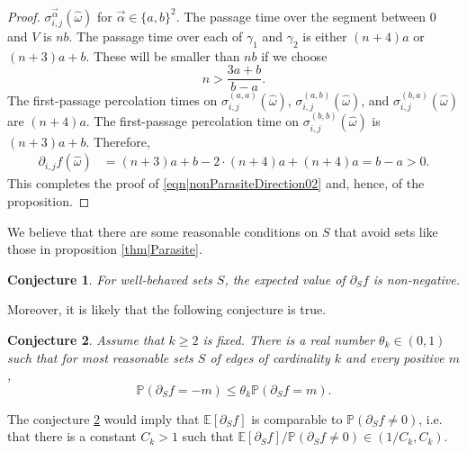 \documentclass[reqno]{amsart}
\newtheorem{conjecture}{Conjecture}
\begin{document}
\begin{proof}
$\sigma_{i,j}^{\overrightarrow \alpha}(\hat\omega)$ for $\overrightarrow \alpha\in\{a,b\}^2$. 
 The passage time over the segment between $0$ and $V$ is 
$nb$. The passage time over each of $\gamma_1$ and $\gamma_2$ is either $(n+4)a$ or $(n+3)a+b$. These will be smaller than 
$nb$ if we choose \[n>\frac{3a+b}{b-a}.\]
The first-passage percolation times on $\sigma_{i,j}^{(a,a)}(\hat\omega)$, $\sigma_{i,j}^{(a,b)}(\hat\omega)$, and 
$\sigma_{i,j}^{(b,a)}(\hat\omega)$ are $(n+4)a$. The first-passage percolation time on $\sigma_{i,j}^{(b,b)}(\hat\omega)$
is $(n+3)a+b$. Therefore, 
\begin{align*}
\partial_{i,j}f(\hat\omega)&=(n+3)a+b-2\cdot (n+4)a+(n+4)a=b-a>0.
\end{align*}
This completes the proof of \eqref{eqn|nonParasiteDirection02} and, hence, of the proposition.
\end{proof}


We believe that there are some reasonable conditions on $S$ that avoid sets like those in proposition \ref{thm|Parasite}. 
\begin{conjecture}\label{conj|PositiveExpectation} For well-behaved sets $S$, the expected value of $\partial_Sf$ is non-negative. 
\end{conjecture}




Moreover, it is likely that the following conjecture is true.
 \begin{conjecture}\label{conj|PositiveDrift} Assume that $k\geq 2$ is fixed. There is a real number $\theta_k\in(0,1)$ such that for most reasonable sets $S$ of edges  of cardinality $k$ and every positive $m$, \[\mathbb P(\partial_Sf=-m)\leq  \theta_k \mathbb P(\partial_Sf=m).\] 
\end{conjecture}
The conjecture \ref{conj|PositiveDrift} would imply that $\mathbb E\left[\partial_Sf\right]$ is comparable to $\mathbb P(\partial_Sf\neq 0)$, i.e. that there is a constant $C_k>1$ such that $\mathbb E\left[\partial_Sf\right]/\mathbb P\left(\partial_Sf\neq 0\right)\in \left(1/C_k,C_k\right)$.
\end{document}

